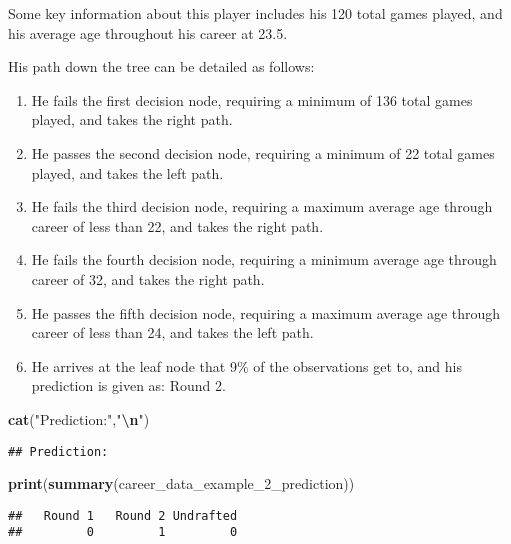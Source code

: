 \documentclass[
]{article}
\newenvironment{Shaded}{\begin{snugshade}}{\end{snugshade}}
\newcommand{\FunctionTok}[1]{\textcolor[rgb]{0.13,0.29,0.53}{\textbf{#1}}}
\newcommand{\NormalTok}[1]{#1}
\newcommand{\SpecialCharTok}[1]{\textcolor[rgb]{0.81,0.36,0.00}{\textbf{#1}}}
\newcommand{\StringTok}[1]{\textcolor[rgb]{0.31,0.60,0.02}{#1}}
\providecommand{\tightlist}{%
  \setlength{\itemsep}{0pt}\setlength{\parskip}{0pt}}
\begin{document}
Some key information about this player includes his 120 total games
played, and his average age throughout his career at 23.5.

His path down the tree can be detailed as follows:

\begin{enumerate}
\def\labelenumi{\arabic{enumi}.}
\tightlist
\item
  He fails the first decision node, requiring a minimum of 136 total
  games played, and takes the right path.
\item
  He passes the second decision node, requiring a minimum of 22 total
  games played, and takes the left path.
\item
  He fails the third decision node, requiring a maximum average age
  through career of less than 22, and takes the right path.
\item
  He fails the fourth decision node, requiring a minimum average age
  through career of 32, and takes the right path.
\item
  He passes the fifth decision node, requiring a maximum average age
  through career of less than 24, and takes the left path.
\item
  He arrives at the leaf node that 9\% of the observations get to, and
  his prediction is given as: Round 2.
\end{enumerate}

\begin{Shaded}
\begin{Highlighting}[]
\FunctionTok{cat}\NormalTok{(}\StringTok{"Prediction:"}\NormalTok{,}\StringTok{"}\SpecialCharTok{\textbackslash{}n}\StringTok{"}\NormalTok{)}
\end{Highlighting}
\end{Shaded}

\begin{verbatim}
## Prediction:
\end{verbatim}

\begin{Shaded}
\begin{Highlighting}[]
\FunctionTok{print}\NormalTok{(}\FunctionTok{summary}\NormalTok{(career\_data\_example\_2\_prediction))}
\end{Highlighting}
\end{Shaded}

\begin{verbatim}
##   Round 1   Round 2 Undrafted 
##         0         1         0
\end{verbatim}
\end{document}
